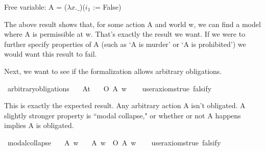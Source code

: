 \begin{isabellebody}
{  Free variable:
    A = ($\lambda x. \_$)($i_1$ := False)\color{black}%
}%
\endisatagproof
{\isafoldproof}%
%
\isadelimproof
%
\endisadelimproof
%
\begin{isamarkuptext}%
The above result shows that, for some action A and world w, we can find a model where A 
        is permissible at w. That's exactly the result we want. If we were to further specify properties
        of A (such as `A is murder' or `A is prohibited') we would want this result to fail.%
\end{isamarkuptext}\isamarkuptrue%
%
\begin{isamarkuptext}%
Next, we want to see if the formalization allows arbitrary obligations.%
\end{isamarkuptext}\isamarkuptrue%
\isamarkupfalse%
\ arbitrary{\isacharunderscore}obligations{\isacharcolon}\isanewline
\ \ \ A{\isacharcolon}{\isacharcolon}{\isachardoublequoteopen}t{\isachardoublequoteclose}\isanewline
\ \ \ {\isachardoublequoteopen}O\ {\isacharbraceleft}A{\isacharbraceright}\ w{\isachardoublequoteclose}\isanewline
\ \ \isamarkupfalse%
\ {\isacharbrackleft}user{\isacharunderscore}axioms{\isacharequal}true{\isacharcomma}\ falsify{\isacharbrackright}%
\isadelimproof
\ %
\endisadelimproof
%
\isatagproof
{}\isamarkupfalse%
\isanewline
%
%
\endisatagproof
{\isafoldproof}%
%
\isadelimproof
%
\endisadelimproof
%
\begin{isamarkuptext}%
This is exactly the expected result. Any arbitrary action A isn't obligated. A slightly 
        stronger property is ``modal collapse," or whether or not A happens implies A is obligated.%
\end{isamarkuptext}\isamarkuptrue%
\isamarkupfalse%
\ modal{\isacharunderscore}collapse{\isacharcolon}\isanewline
\ \ \ A\ w\isanewline
\ \ \ {\isachardoublequoteopen}A\ w\ {\isasymlongrightarrow}\ O\ {\isacharbraceleft}A{\isacharbraceright}\ w{\isachardoublequoteclose}\isanewline
\ \ \isamarkupfalse%
\ {\isacharbrackleft}user{\isacharunderscore}axioms{\isacharequal}true{\isacharcomma}\ falsify{\isacharbrackright}%
\isadelimproof
\ %
\endisadelimproof
%
\isatagproof
{}\isamarkupfalse%
\isanewline
%
\end{isabellebody}
